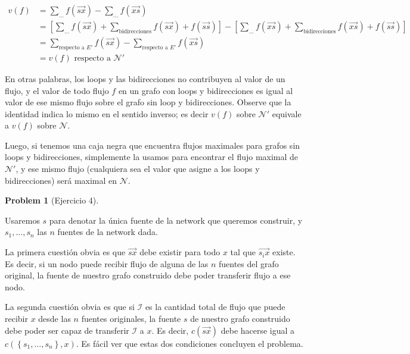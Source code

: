 \documentclass[a4paper]{article}
\newtheorem{problem}{Problem}
\newtheorem{problem}{Problem}
\begin{document}
    \begin{align*}
        v(f) &= \sum_{\ldots} f(\overrightarrow{sx}) -
        \sum_{\ldots}f(\overrightarrow{xs}) \\ 
             &= \left[ \sum_{\ldots} f(\overrightarrow{sx}) +
                 \sum_{\text{bidirecciones}} f(\overrightarrow{sx}) +
                 f(\overrightarrow{ss}) \right] - \left[  \sum_{\ldots}
             f(\overrightarrow{xs}) + \sum_{\text{bidirecciones}} f(\overrightarrow{xs})+  f(\overrightarrow{ss}) \right] \\ 
             &= \sum_{\text{respecto a } E'} f(\overrightarrow{sx}) -
             \sum_{\text{respecto a } E'}f(\overrightarrow{xs}) \\ 
             &=v(f) \text{ respecto a  } \mathcal{N}'
    \end{align*}

En otras palabras, los loops y las bidirecciones no contribuyen al valor de un
flujo, y el valor de todo flujo $f$ en un grafo con loops y bidirecciones es
igual al valor de ese mismo flujo sobre el grafo sin loop y bidirecciones.
Observe que la identidad indica lo mismo en el sentido inverso; es decir $v(f)$
sobre $\mathcal{N}'$ equivale a $v(f)$ sobre $\mathcal{N}$.

Luego, si tenemos una caja negra que encuentra flujos maximales para grafos sin
loops y bidirecciones, simplemente la usamos para encontrar el flujo maximal de
$\mathcal{N}'$, y ese mismo flujo (cualquiera sea el valor que asigne a los
loops y bidirecciones) será maximal en $\mathcal{N}$.

\begin{problem}[Ejercicio 4]
    
\end{problem}

Usaremos $s$ para denotar la única fuente de la network que queremos construir,
y $s_1, \ldots, s_n$ las $n$ fuentes de la network dada. 

La primera cuestión obvia es que $\overrightarrow{sx}$ debe existir para todo
$x $ tal que $\overrightarrow{s_i x}$ existe. Es decir, si un nodo puede recibir
flujo de alguna de las $n$ fuentes del grafo original, la fuente de nuestro
grafo construido debe poder transferir flujo a ese nodo.

La segunda cuestión obvia es que si $\mathscr{I}$ es la cantidad total de flujo
que puede recibir $x$ desde las $n$ fuentes originales, la fuente $s$ de nuestro
grafo construido debe poder ser capaz de transferir $\mathscr{I}$ a $x$. Es
decir, $c(\overrightarrow{sx})$ debe hacerse igual a $c(\left\{ s_1, \ldots, s_n
\right\}, x )$. Es fácil ver que estas dos condiciones concluyen el problema. 
\end{document}
